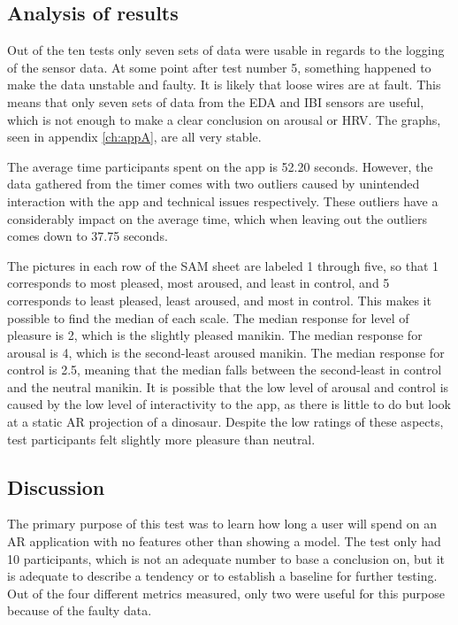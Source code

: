 \subsection{Analysis of results}
Out of the ten tests only seven sets of data were usable in regards to the logging of the sensor data. At some point after test number 5, something happened to make the data unstable and faulty. It is likely that loose wires are at fault. This means that only seven sets of data from the EDA and IBI sensors are useful, which is not enough to make a clear conclusion on arousal or HRV. The graphs, seen in appendix \ref{ch:appA}, are all very stable.

The average time participants spent on the app is 52.20 seconds. However, the data gathered from the timer comes with two outliers caused by unintended interaction with the app and technical issues respectively. These outliers have a considerably impact on the average time, which when leaving out the outliers comes down to 37.75 seconds. 

The pictures in each row of the SAM sheet are labeled 1 through five, so that 1 corresponds to most pleased, most aroused, and least in control, and 5 corresponds to least pleased, least aroused, and most in control. This makes it possible to find the median of each scale. The median response for level of pleasure is 2, which is the slightly pleased manikin. The median response for arousal is 4, which is the second-least aroused manikin. The median response for control is 2.5, meaning that the median falls between the second-least in control and the neutral manikin. It is possible that the low level of arousal and control is caused by the low level of interactivity to the app, as there is little to do but look at a static AR projection of a dinosaur. Despite the low ratings of these aspects, test participants felt slightly more pleasure than neutral. 

\subsection{Discussion}
The primary purpose of this test was to learn how long a user will spend on an AR application with no features other than showing a model. The test only had 10 participants, which is not an adequate number to base a conclusion on, but it is adequate to describe a tendency or to establish a baseline for further testing. Out of the four different metrics measured, only two were useful for this purpose because of the faulty data. 

